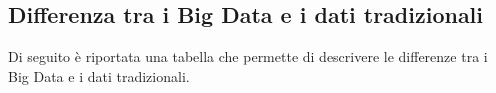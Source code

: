 \subsection{Differenza tra i Big Data e i dati tradizionali}

Di seguito è riportata una tabella che permette di descrivere le differenze tra i Big Data e i dati tradizionali.\cite{big_vs_traditional_data}

